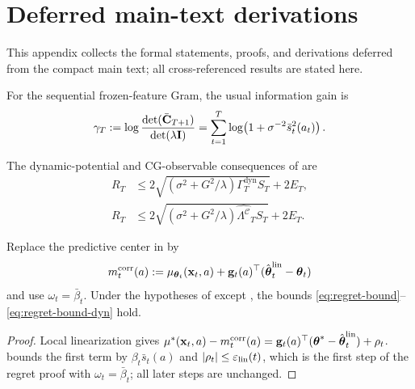 \documentclass[twoside]{article}
\newcommand{\Calg}{\mathcal{C}}                 %
\newcommand{\Lamalg}{\Lambda^{\Calg}}           %
\newcommand{\Gamdyn}{\Gamma^{\mathrm{dyn}}}     %
\begin{document}
\appendix
\onecolumn %
\section{Deferred main-text derivations}\label{app:deferred}
This appendix collects the formal statements, proofs, and derivations deferred
from the compact main text; all cross-referenced results are stated here.

For the sequential frozen-feature Gram, the usual information gain is
\begin{equation}\label{eq:infogain}
\gamma_T:=\log\frac{\det(\bar{\mathbf{C}}_{T+1})}{\det(\lambda\mathbf{I})}
=\sum_{t=1}^T\log\!\left(1+\sigma^{-2}\bar s_t^2(a_t)\right).
\end{equation}

The dynamic-potential and CG-observable consequences of  are
\begin{equation}\label{eq:regret-bound-dyn}
\begin{aligned}
R_T&\le2\sqrt{(\sigma^2+G^2/\lambda)\Gamdyn_T S_T}+2E_T,\\
R_T&\le2\sqrt{(\sigma^2+G^2/\lambda)\widehat{\Lamalg}_T S_T}+2E_T.
\end{aligned}
\end{equation}

\begin{corollary}\label{cor:corrected-center}
Replace the predictive center in  by
\begin{equation}\label{eq:corrected-center}
m_t^{\mathrm{corr}}(a):=\mu_{\boldsymbol{\theta}_t}(\mathbf{x}_t,a)
+\mathbf{g}_t(a)^\top(\hat{\boldsymbol{\theta}}_t^{\mathrm{lin}}-\boldsymbol{\theta}_t)
\end{equation}
and use $\omega_t=\bar\beta_t$.  Under the hypotheses of
 except , the bounds
\eqref{eq:regret-bound}--\eqref{eq:regret-bound-dyn} hold.
\end{corollary}
\begin{proof}
Local linearization gives
$\mu^*(\mathbf{x}_t,a)-m_t^{\mathrm{corr}}(a)
=\mathbf{g}_t(a)^\top(\boldsymbol{\theta}^*-\hat{\boldsymbol{\theta}}_t^{\mathrm{lin}})+\rho_t$.
 bounds the first term by
$\beta_t\bar s_t(a)$ and $|\rho_t|\le\varepsilon_{\mathrm{lin}}(t)$, which is the first step
of the regret proof with $\omega_t=\bar\beta_t$; all later steps are unchanged.
\end{proof}
\end{document}
